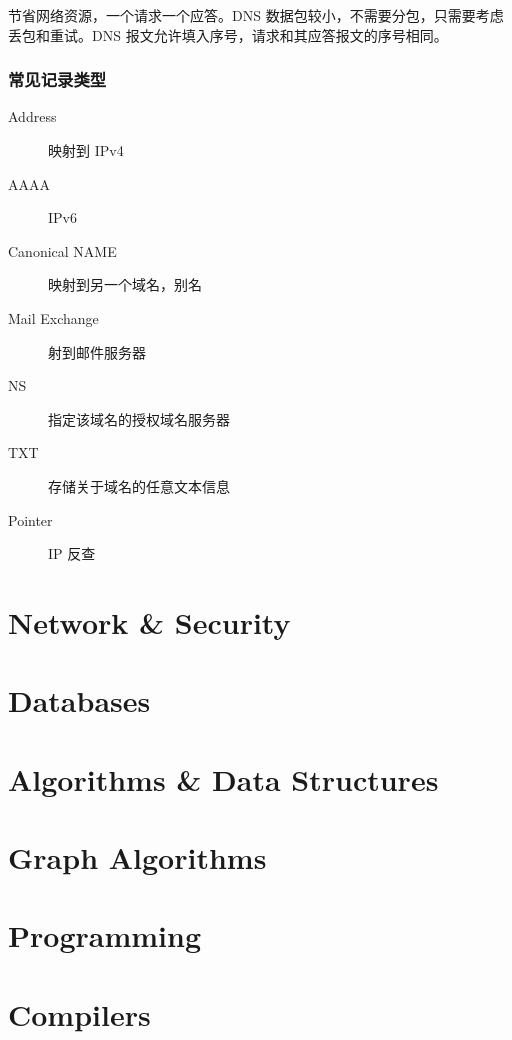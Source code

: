 \documentclass[11pt,journal,compsoc]{IEEEtran}
\begin{document}
节省网络资源，一个请求一个应答。DNS 数据包较小，不需要分包，只需要考虑丢包和重试。DNS 报文允许填入序号，请求和其应答报文的序号相同。


\subsubsection{常见记录类型}

\begin{description}
    \item[Address] 映射到 IPv4

    \item[AAAA] IPv6

    \item[Canonical NAME] 映射到另一个域名，别名

    \item[Mail Exchange] 射到邮件服务器

    \item[NS] 指定该域名的授权域名服务器

    \item[TXT] 存储关于域名的任意文本信息

    \item[Pointer] IP 反查
\end{description}


\section{Network \& Security}


\section{Databases}


\section{Algorithms \& Data Structures}


\section{Graph Algorithms}


\section{Programming}


\section{Compilers}
\end{document}
